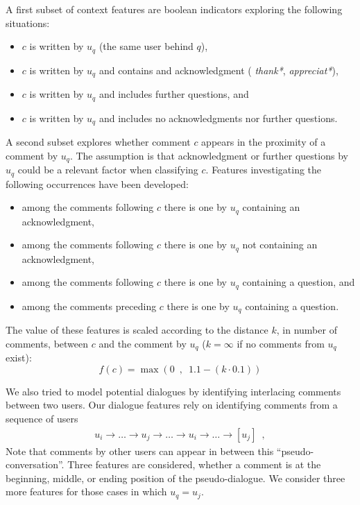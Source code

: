 A first subset of context features are boolean indicators exploring the 
following situations:

\begin{itemize}\setlength\itemsep{-0.4em}
\item $c$ is written by $u_q$ (\ie the same user behind $q$),
\item \label{enu:context_ack} 
  $c$ is written by $u_q$ and contains and acknowledgment (\eg   
  \textit{thank*}, \textit{appreciat*}),
\item \label{enu:context_quest}
  $c$ is written by $u_q$ and includes further questions, and 
\item $c$ is written by $u_q$ and includes no acknowledgments nor further 
questions.
\end{itemize}
% 
A second subset explores whether comment $c$ appears in the proximity of a 
comment by $u_q$. The assumption is that acknowledgment or further 
questions by 
$u_q$ could be a relevant factor when classifying $c$. Features investigating 
the following occurrences have been developed:

\begin{itemize}\setlength\itemsep{-0.4em}
\item among the comments following $c$ there is one by $u_q$ containing 
an acknowledgment,
\item among the comments following $c$ there is one by $u_q$ not 
containing an acknowledgment,
\item among the comments following $c$ there is one by $u_q$ containing a 
question, and
\item among the comments preceding $c$ there is one by $u_q$ containing a 
question.
\end{itemize}

The value of these features is scaled according to the distance $k$, in number 
of comments, between $c$ and the comment by $u_q$ ($k=\infty$ if no 
comments from $u_q$ exist):
% 
\begin{equation}
 f(c)=\max \left(0\enspace,\enspace 1.1-(k \cdot 0.1) \right)
\end{equation}
%

We also tried to model potential dialogues by identifying interlacing comments 
between two users. Our dialogue features rely on identifying comments from
a sequence of users 
\begin{align*}
u_i \rightarrow \ldots \rightarrow 
u_j \rightarrow \ldots \rightarrow
u_i \rightarrow \ldots \rightarrow
[u_j] \enspace ,
\end{align*}
% 
Note that comments by other 
users can appear in between this ``pseudo-conversation''. Three features are 
considered, whether a comment is at the beginning, middle, or ending position of 
the pseudo-dialogue. We consider three more features for those cases in which 
$u_q=u_j$. 

